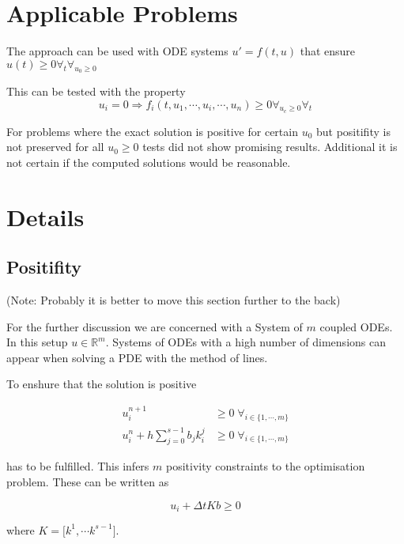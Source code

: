 \documentclass{article}
\begin{document}
\section{Applicable Problems}\label{sec:app_problem}
The approach can be used with ODE systems $u' = f(t,u)$ that ensure  $u(t) \geq 0 \forall_t \forall_{  u_0 \geq 0}$ 

This can be tested with the property 
\begin{equation}
u_i=0 \Rightarrow f_i(t,u_1,\cdots,u_i,\cdots,u_n) \geq 0  \forall_{u_c \geq 0} \forall_{t}
\end{equation}

For problems where the exact solution is positive for certain $u_0$ but positifity is not preserved for all $u_0 \geq 0$ tests did not show promising results. Additional it is not certain if the computed solutions would be reasonable.

\section{Details}\label{sec:Deta	ils}

\subsection{Positifity}

(Note: Probably it is better to move this section further to the back)

For the further discussion we are concerned with a System of $m$ coupled ODEs. 
In this setup  $u \in \mathbb{R}^m$.
Systems of ODEs with a high number of dimensions can appear when solving a PDE with the method of lines.

To enshure that the solution is positive 

\begin{align}
 u_i^{n+1} &\geq 0   \;   \forall_{i \in \{1, \cdots,m \}}  \\
 u_i^n + h \sum_{j=0}^{s-1} b_j k_i^j  &\geq 0   \;   \forall_{i \in \{1,\cdots,m \}}  
\end{align}

has to be fulfilled.
This infers $m$ positivity constraints to the optimisation problem. These can be written as

\begin{equation}
u_i + \Delta t K  b \geq 0     
\end{equation}

where $K = \big[k^1 , \cdots k^{s-1}\big]$.
\end{document}
